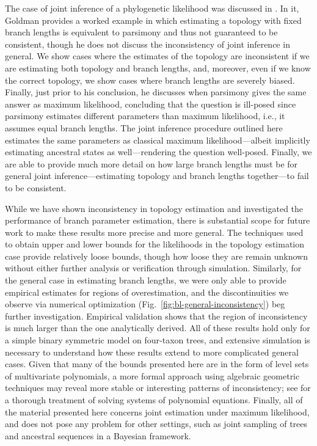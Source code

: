 \documentclass[11pt]{article}
\begin{document}
The case of joint inference of a phylogenetic likelihood was discussed in \citet{Goldman1990-dk}.
In it, Goldman provides a worked example in which estimating a topology with fixed branch lengths is equivalent to parsimony and thus not guaranteed to be consistent, though he does not discuss the inconsistency of joint inference in general.
We show cases where the estimates of the topology are inconsistent if we are estimating both topology and branch lengths, and, moreover, even if we know the correct topology, we show cases where branch lengths are severely biased.
Finally, just prior to his conclusion, he discusses when parsimony gives the same answer as maximum likelihood, concluding that the question is ill-posed since parsimony estimates different parameters than maximum likelihood, i.e., it assumes equal branch lengths.
The joint inference procedure outlined here estimates the same parameters as classical maximum likelihood---albeit implicitly estimating ancestral states as well---rendering the question well-posed.
Finally, we are able to provide much more detail on how large branch lengths must be for general joint inference---estimating topology and branch lengths together---to fail to be consistent.

While we have shown inconsistency in topology estimation and investigated the performance of branch parameter estimation, there is substantial scope for future work to make these results more precise and more general.
The techniques used to obtain upper and lower bounds for the likelihoods in the topology estimation case provide relatively loose bounds, though how loose they are remain unknown without either further analysis or verification through simulation.
Similarly, for the general case in estimating branch lengths, we were only able to provide empirical estimates for regions of overestimation, and the discontinuities we observe via numerical optimization (Fig.~\ref{fig:bl-general-inconsistency}) beg further investigation.
Empirical validation shows that the region of inconsistency is much larger than the one analytically derived.
All of these results hold only for a simple binary symmetric model on four-taxon trees, and extensive simulation is necessary to understand how these results extend to more complicated general cases.
Given that many of the bounds presented here are in the form of level sets of multivariate polynomials, a more formal approach using algebraic geometric techniques may reveal more stable or interesting patterns of inconsistency; see \citet{Sturmfels2002} for a thorough treatment of solving systems of polynomial equations.
Finally, all of the material presented here concerns joint estimation under maximum likelihood, and does not pose any problem for other settings, such as joint sampling of trees and ancestral sequences in a Bayesian framework.
\end{document}
